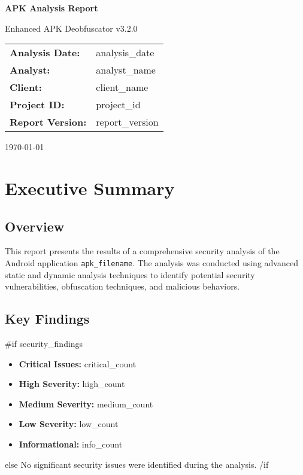 \documentclass[11pt,a4paper]{article}
\begin{document}
\begin{titlepage}
    \centering
    \vspace*{2cm}
    
    {\Huge\bfseries APK Analysis Report\par}
    \vspace{1cm}
    
    {\Large Enhanced APK Deobfuscator v3.2.0\par}
    \vspace{2cm}
    
    \begin{tabular}{ll}
        \textbf{Analysis Date:} & {{analysis_date}} \\
        \textbf{Analyst:} & {{analyst_name}} \\
        \textbf{Client:} & {{client_name}} \\
        \textbf{Project ID:} & {{project_id}} \\
        \textbf{Report Version:} & {{report_version}} \\
    \end{tabular}
    
    \vfill
    
    {\large \today\par}
\end{titlepage}

\tableofcontents
\newpage

\section{Executive Summary}

\subsection{Overview}
This report presents the results of a comprehensive security analysis of the Android application \texttt{{{apk_filename}}}. The analysis was conducted using advanced static and dynamic analysis techniques to identify potential security vulnerabilities, obfuscation techniques, and malicious behaviors.

\subsection{Key Findings}
{{#if security_findings}}
\begin{itemize}
    \item \textbf{Critical Issues:} {{critical_count}}
    \item \textbf{High Severity:} {{high_count}}
    \item \textbf{Medium Severity:} {{medium_count}}
    \item \textbf{Low Severity:} {{low_count}}
    \item \textbf{Informational:} {{info_count}}
\end{itemize}
{{else}}
No significant security issues were identified during the analysis.
{{/if}}
\end{document}
